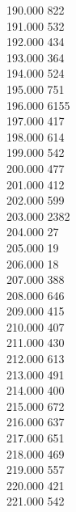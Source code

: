 { 190.000	822 \\
 191.000	532 \\
 192.000	434 \\
 193.000	364 \\
 194.000	524 \\
 195.000	751 \\
 196.000	6155 \\
 197.000	417 \\
 198.000	614 \\
 199.000	542 \\
 200.000	477 \\
 201.000	412 \\
 202.000	599 \\
 203.000	2382 \\
 204.000	27 \\
 205.000	19 \\
 206.000	18 \\
 207.000	388 \\
 208.000	646 \\
 209.000	415 \\
 210.000	407 \\
 211.000	430 \\
 212.000	613 \\
 213.000	491 \\
 214.000	400 \\
 215.000	672 \\
 216.000	637 \\
 217.000	651 \\
 218.000	469 \\
 219.000	557 \\
 220.000	421 \\
 221.000	542 \\
}
